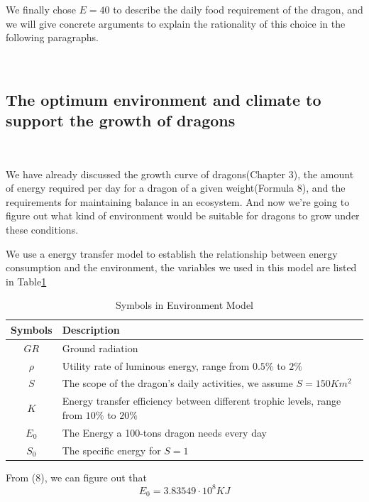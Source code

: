 \documentclass{mcmthesis}
\begin{document}
We finally chose $E=40$ to describe the daily food requirement of the dragon, and we will give concrete arguments to explain the rationality of this choice in the following paragraphs.


~\ \
\subsection{The optimum environment and climate to support the growth of dragons}
~\ \

We have already discussed the growth curve of dragons(Chapter 3), the amount of energy required per day for a dragon of a given weight(Formula 8), and the requirements for maintaining balance in an ecosystem. And now we're going  to figure out what kind of environment would be suitable for dragons to grow under these conditions.

We use a energy transfer model to establish the relationship between energy consumption and the environment, the variables we used in this model are listed in Table\ref{tb:Variables5}


\begin{table}[h]
\centering
\caption{Symbols in Environment Model}
\begin{tabular}{cl}
\toprule
\textbf{Symbols}   & \textbf{Description}                                   \\
\midrule
$GR$               & Ground radiation                                            \\
$\rho$             & Utility rate of luminous energy, range from $0.5\%$ to $2\%$                             \\
$S$                & The scope of the dragon's daily activities, we assume $S=150Km^{2}$       \\
$K$                & Energy transfer efficiency between different trophic levels, range from $10\%$ to $20\%$ \\
$E_{0}$            & The Energy a 100-tons dragon needs every day                \\
$S_{0}$            & The specific energy for $S=1$                               \\
\bottomrule
\end{tabular}\label{tb:Variables5}
\end{table}

From (8), we can figure out that
\begin{equation}
    E_{0}=3.83549\cdot 10^{8}KJ
\end{equation}
\end{document}
